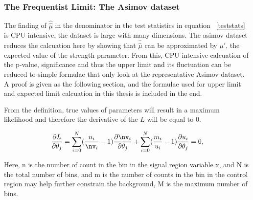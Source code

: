 %
%
%
%





\subsubsection{The Frequentist Limit: The Asimov dataset}
\label{freq:asimov}

The finding of $\hat{\hat{\mu}}$ in the denominator in the test statistics in equation ~\ref{teststats} is CPU intensive, the dataset is large with many dimensions. The asimov dataset reduces the calcuation here by showing that $\hat{\hat{\mu}}$ can be approximated by $\mu'$, the expected value of the strength parameter. From this, CPU intensive calcuation of the p-value, significance and thus the upper limit and its fluctuation can be reduced to simple formulae that only look at the representative Asimov dataset. 
A proof is given as the following section, and the formulae used for upper limit and expected limit calcuation in this thesis is included in the end. 

From the definition, true values of parameters will result in a maximum likelihood and therefore the derivative of the ${L}$ will be equal to 0. 

\begin{equation}
\frac{\partial{L}}{\partial{\theta_{j}}} = \sum_{i=0}^{N}(\frac{n_{i}}{\nv_{i}}-1) \frac{\partial{\nv_{i}}}{\partial{\theta_{j}}}+ \sum_{i=0}^{N}(\frac{m_{i}}{u_{i}}-1) \frac{\partial{u_{i}}}{\partial{\theta_{j}}} =  0 , 
\end{equation}

Here, n is the number of count in the bin in the signal region variable x, and N is the total number of bins, and m is the number of counts in the bin in the control region may help further constrain the background, M is the maximum number of bins. 


